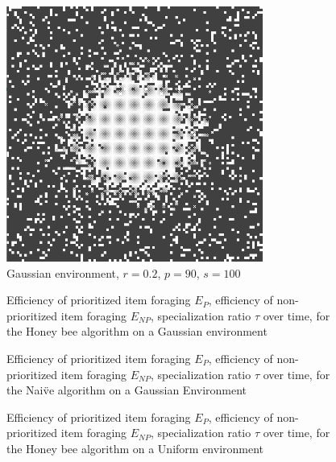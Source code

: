 \begin{figure}[!htb]
\centering
\includegraphics[width=0.75\textwidth]{chapters/chapter6/figures/flexibility-gaussian-obj90-ratio.PNG}
\caption{Gaussian environment, $r=0.2$, $p=90$, $s=100$}
\label{fig:gaussianhighdensityenv}
\end{figure}

\begin{figure}[!htb]
\centering
\small
\resizebox{\textwidth}{!}{}
\caption{Efficiency of prioritized item foraging $E_P$, efficiency of non-prioritized item foraging $E_{NP}$, specialization ratio $\tau$ over time, for the Honey bee algorithm on a Gaussian environment}
\label{fig:gaussianhighdensityperformancehoneybee}
\end{figure}

\begin{figure}[!htb]
\centering
\small
\resizebox{\textwidth}{!}{}
\caption{Efficiency of prioritized item foraging $E_P$, efficiency of non-prioritized item foraging $E_{NP}$, specialization ratio $\tau$ over time, for the Nai\"ve algorithm on a Gaussian Environment}
\label{fig:gaussianhighdensityperformancenaive}
\end{figure}

\begin{figure}[!htb]
\centering
\small
\resizebox{\textwidth}{!}{}
\caption{Efficiency of prioritized item foraging $E_P$, efficiency of non-prioritized item foraging $E_{NP}$, specialization ratio $\tau$ over time, for the Honey bee algorithm on a Uniform environment}
\label{fig:uniformhighdensityperformancehoneybee}
\end{figure}


